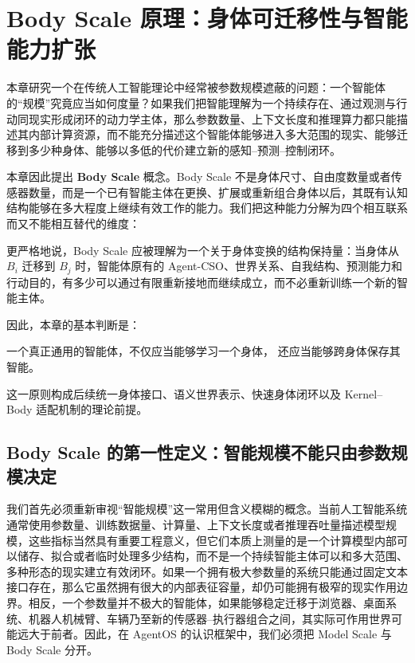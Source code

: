 \chapter{Body Scale 原理：身体可迁移性与智能能力扩张}

\begin{chapterlead}
本章研究一个在传统人工智能理论中经常被参数规模遮蔽的问题：一个智能体的“规模”究竟应当如何度量？如果我们把智能理解为一个持续存在、通过观测与行动同现实形成闭环的动力学主体，那么参数数量、上下文长度和推理算力都只能描述其内部计算资源，而不能充分描述这个智能体能够进入多大范围的现实、能够迁移到多少种身体、能够以多低的代价建立新的感知--预测--控制闭环。

本章因此提出 \textbf{Body Scale} 概念。Body Scale 不是身体尺寸、自由度数量或者传感器数量，而是一个已有智能主体在更换、扩展或重新组合身体以后，其既有认知结构能够在多大程度上继续有效工作的能力。我们把这种能力分解为四个相互联系而又不能相互替代的维度：
\begin{statementbox}
\centering
{}
\end{statementbox}
更严格地说，Body Scale 应被理解为一个关于身体变换的结构保持量：当身体从 $B_i$ 迁移到 $B_j$ 时，智能体原有的 Agent-CSO、世界关系、自我结构、预测能力和行动目的，有多少可以通过有限重新接地而继续成立，而不必重新训练一个新的智能主体。

因此，本章的基本判断是：
\begin{statementbox}
一个真正通用的智能体，不仅应当能够学习一个身体，
还应当能够跨身体保存其智能。
\end{statementbox}
这一原则构成后续统一身体接口、语义世界表示、快速身体闭环以及 Kernel--Body 适配机制的理论前提。
\end{chapterlead}


\section{Body Scale 的第一性定义：智能规模不能只由参数规模决定}

我们首先必须重新审视“智能规模”这一常用但含义模糊的概念。当前人工智能系统通常使用参数量、训练数据量、计算量、上下文长度或者推理吞吐量描述模型规模，这些指标当然具有重要工程意义，但它们本质上测量的是一个计算模型内部可以储存、拟合或者临时处理多少结构，而不是一个持续智能主体可以和多大范围、多种形态的现实建立有效闭环。如果一个拥有极大参数量的系统只能通过固定文本接口存在，那么它虽然拥有很大的内部表征容量，却仍可能拥有极窄的现实作用边界。相反，一个参数量并不极大的智能体，如果能够稳定迁移于浏览器、桌面系统、机器人机械臂、车辆乃至新的传感器--执行器组合之间，其实际可作用世界可能远大于前者。因此，在 AgentOS 的认识框架中，我们必须把 Model Scale 与 Body Scale 分开。

